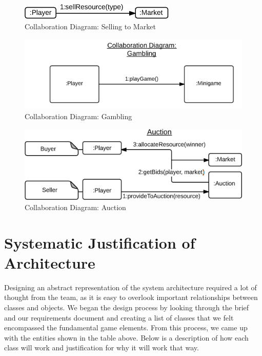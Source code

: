 \begin{figure}[p]
	\begin{centering}
		\includegraphics[]{figures/collab6.png}
		\caption{Collaboration Diagram: Selling to Market}
		\label{fig:collab6}
	\end{centering}
\end{figure}
\begin{figure}[p]
	\begin{centering}
		\includegraphics[]{figures/collab7.png}
		\caption{Collaboration Diagram: Gambling}
		\label{fig:collab7}
	\end{centering}
\end{figure}
\begin{figure}[h]
	\begin{centering}
		\includegraphics[width=\textwidth]{figures/collab8.png}
		\caption{Collaboration Diagram: Auction}
		\label{fig:collab8}
	\end{centering}
\end{figure}


\section{Systematic Justification of Architecture}
Designing an abstract representation of the system architecture required a lot of thought from the team, as it is easy to overlook important relationships between classes and objects.
We began the design process by looking through the brief and our requirements document and creating a list of classes that we felt encompassed the fundamental game elements.
From this process, we came up with the entities shown in the table above.
Below is a description of how each class will work and justification for why it will work that way.

